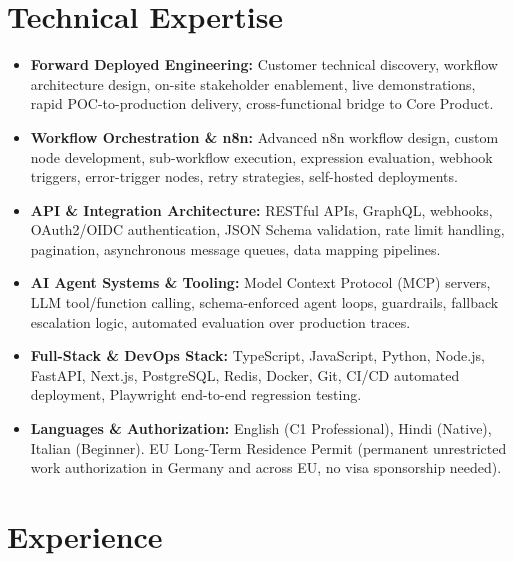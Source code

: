 \documentclass[10pt,a4paper]{article}
\begin{document}
\section{Technical Expertise}
\begin{itemize}
  \item \textbf{Forward Deployed Engineering:} Customer technical discovery, workflow architecture design, on-site stakeholder enablement, live demonstrations, rapid POC-to-production delivery, cross-functional bridge to Core Product.
  \item \textbf{Workflow Orchestration \& n8n:} Advanced n8n workflow design, custom node development, sub-workflow execution, expression evaluation, webhook triggers, error-trigger nodes, retry strategies, self-hosted deployments.
  \item \textbf{API \& Integration Architecture:} RESTful APIs, GraphQL, webhooks, OAuth2/OIDC authentication, JSON Schema validation, rate limit handling, pagination, asynchronous message queues, data mapping pipelines.
  \item \textbf{AI Agent Systems \& Tooling:} Model Context Protocol (MCP) servers, LLM tool/function calling, schema-enforced agent loops, guardrails, fallback escalation logic, automated evaluation over production traces.
  \item \textbf{Full-Stack \& DevOps Stack:} TypeScript, JavaScript, Python, Node.js, FastAPI, Next.js, PostgreSQL, Redis, Docker, Git, CI/CD automated deployment, Playwright end-to-end regression testing.
  \item \textbf{Languages \& Authorization:} English (C1 Professional), Hindi (Native), Italian (Beginner). EU Long-Term Residence Permit (permanent unrestricted work authorization in Germany and across EU, no visa sponsorship needed).
\end{itemize}

\section{Experience}
\end{document}
